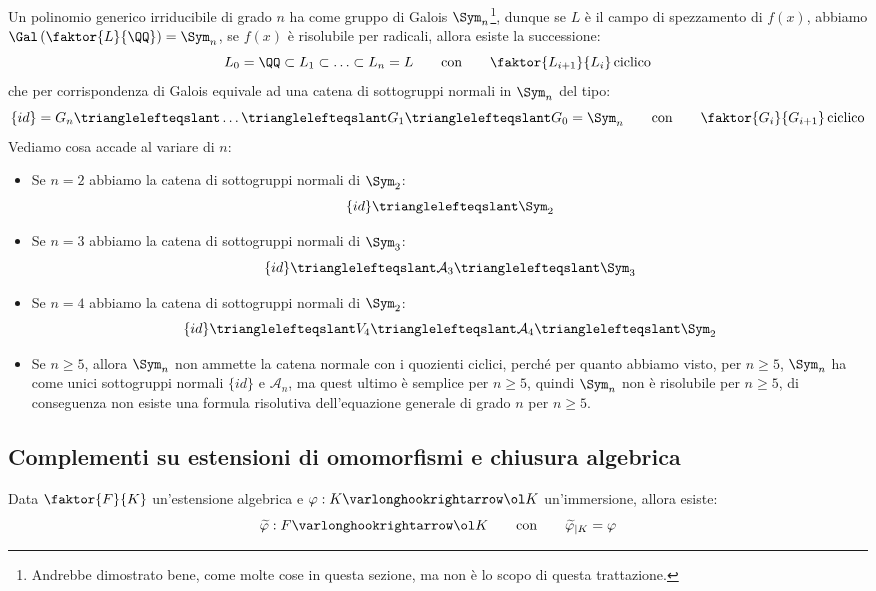 \documentclass[11pt]{scrartcl}
\begin{document}
Un polinomio generico irriducibile di grado $n$ ha come gruppo di Galois $\Sym_n$\footnote{Andrebbe dimostrato bene, come molte cose in questa sezione, ma non è lo scopo di questa trattazione.}, dunque se $L$ è il campo di spezzamento di $f(x)$, abbiamo $\Gal\left(\faktor{L}{\QQ}\right) = \Sym_n$, se $f(x)$ è risolubile per radicali, allora esiste la successione:
\[ L_0 = \QQ \subset L_1 \subset \ldots \subset L_n = L \qquad \text{con} \qquad \faktor{L_{i+1}}{L_i}\,\text{ciclico}
\]
che per corrispondenza di Galois equivale ad una catena di sottogruppi normali in $\Sym_n$ del tipo:
\[ \{id\} = G_n \trianglelefteqslant \ldots \trianglelefteqslant G_1 \trianglelefteqslant G_0 = \Sym_n \qquad \text{con} \qquad \faktor{G_{i}}{G_{i+1}}\,\text{ciclico}
    \]
Vediamo cosa accade al variare di $n$:
\begin{itemize}
    \item Se $n = 2$ abbiamo la catena di sottogruppi normali di $\Sym_2$:
    \[ \{id\} \trianglelefteqslant \Sym_2
        \]
    \item Se $n = 3$ abbiamo la catena di sottogruppi normali di $\Sym_3$:
    \[ \{id\} \trianglelefteqslant \mathcal{A}_3 \trianglelefteqslant \Sym_3
        \]
    \item Se $n = 4$ abbiamo la catena di sottogruppi normali di $\Sym_2$:
    \[ \{id\} \trianglelefteqslant V_4 \trianglelefteqslant \mathcal{A}_4 \trianglelefteqslant \Sym_2
        \]
    \item Se $n \geq 5$, allora $\Sym_n$ non ammette la catena normale con i quozienti ciclici, perché per quanto abbiamo visto, per $n \geq 5$, $\Sym_n$ ha come unici sottogruppi normali $\{id\}$ e $\mathcal{A}_n$, ma quest ultimo è semplice per $n \geq 5$, quindi $\Sym_n$ non è 
    risolubile per $n \geq 5$, di conseguenza non esiste una formula risolutiva dell'equazione generale di grado $n$ per $n \geq 5$.
\end{itemize}

\newpage
\subsection{Complementi su estensioni di omomorfismi e chiusura algebrica}

\begin{theorem}
\label{3.86}
Data $\faktor{F}{K}$ un'estensione algebrica e $\varphi : K \varlonghookrightarrow \ol K$ un'immersione, allora esiste:
\[ \widetilde{\varphi} : F \varlonghookrightarrow \ol K \qquad \text{con} \qquad \widetilde{\varphi}_{|K} = \varphi
    \]
\end{theorem}
\end{document}
